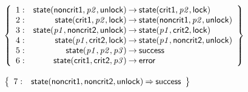 \documentclass[a4paper]{article}
\def\lthtmlcheckvsize{\ifdim\ht\sizebox<\vsize 
  \ifdim\wd\sizebox<\hsize\expandafter\hfill\fi \expandafter\vfill
  \else\expandafter\vss\fi}%
\begin{document}
{\newpage\clearpage
{}%
$\displaystyle \left\{
\begin{array}{rr@{\>}c@{\>}ll}
\mathrm{1} : 
 & \mathsf{state}(\mathsf{noncrit1},\mathit{p2},\mathsf{unlock})
 & \to 
 & \mathsf{state}(\mathsf{crit1},\mathit{p2},\mathsf{lock})\\
\par
\mathrm{2} : 
 & \mathsf{state}(\mathsf{crit1},\mathit{p2},\mathsf{lock})
 & \to 
 & \mathsf{state}(\mathsf{noncrit1},\mathit{p2},\mathsf{unlock})\\
\par
\mathrm{3} : 
 & \mathsf{state}(\mathit{p1},\mathsf{noncrit2},\mathsf{unlock})
 & \to 
 & \mathsf{state}(\mathit{p1},\mathsf{crit2},\mathsf{lock})\\
\par
\mathrm{4} : 
 & \mathsf{state}(\mathit{p1},\mathsf{crit2},\mathsf{lock})
 & \to 
 & \mathsf{state}(\mathit{p1},\mathsf{noncrit2},\mathsf{unlock})\\
\par
\mathrm{5} : 
 & \mathsf{state}(\mathit{p1},\mathit{p2},\mathit{p3})
 & \to 
 & \mathsf{success}\\
\par
\mathrm{6} : 
 & \mathsf{state}(\mathsf{crit1},\mathsf{crit2},\mathit{p3})
 & \to 
 & \mathsf{error}\\
\par
\end{array}
\right\}
$%
\lthtmlindisplaymathZ
\lthtmlcheckvsize\clearpage}

{\newpage\clearpage
{}%
$\displaystyle \left\{
\begin{array}{rr@{\>}c@{\>}ll}
\mathrm{7} : 
 & \mathsf{state}(\mathsf{noncrit1},\mathsf{noncrit2},\mathsf{unlock})
 & \Rightarrow 
 & \mathsf{success}\\
\par
\end{array}
\right\}
$%
\lthtmlindisplaymathZ
\lthtmlcheckvsize\clearpage}
\end{document}
